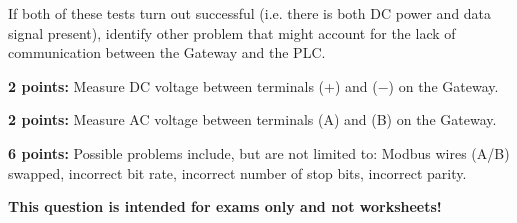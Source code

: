 \vskip 20pt

If both of these tests turn out successful (i.e. there is both DC power and data signal present), identify  other problem that might account for the lack of communication between the Gateway and the PLC.







\noindent
{\bf 2 points:} Measure DC voltage between terminals (+) and ($-$) on the Gateway.

\vskip 10pt

\noindent
{\bf 2 points:} Measure AC voltage between terminals (A) and (B) on the Gateway.

\vskip 10pt

\noindent
{\bf 6 points:} Possible problems include, but are not limited to: Modbus wires (A/B) swapped, incorrect bit rate, incorrect number of stop bits, incorrect parity.







{\bf This question is intended for exams only and not worksheets!}




